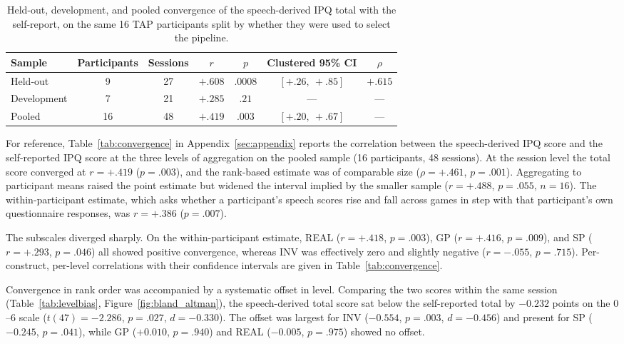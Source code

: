 \begin{table}[t]
\centering
\caption{Held-out, development, and pooled convergence of the speech-derived IPQ total with the self-report, on the same 16 TAP participants split by whether they were used to select the pipeline.}
\label{tab:heldout_convergence}
\small
\begin{tabular}{lcccccc}
\hline
Sample & Participants & Sessions & $r$ & $p$ & Clustered 95\% CI & $\rho$ \\
\hline
Held-out & 9 & 27 & $+.608$ & $.0008$ & $[+.26,\ +.85]$ & $+.615$ \\
Development & 7 & 21 & $+.285$ & $.21$ & --- & --- \\
Pooled & 16 & 48 & $+.419$ & $.003$ & $[+.20,\ +.67]$ & --- \\
\hline
\end{tabular}
\end{table}

For reference, Table~\ref{tab:convergence} in Appendix~\ref{sec:appendix} reports the correlation between the speech-derived IPQ score and the self-reported IPQ score at the three levels of aggregation on the pooled sample (16 participants, 48 sessions). At the session level the total score converged at $r=+.419$ ($p=.003$), and the rank-based estimate was of comparable size ($\rho=+.461$, $p=.001$). Aggregating to participant means raised the point estimate but widened the interval implied by the smaller sample ($r=+.488$, $p=.055$, $n=16$). The within-participant estimate, which asks whether a participant's speech scores rise and fall across games in step with that participant's own questionnaire responses, was $r=+.386$ ($p=.007$).

The subscales diverged sharply. On the within-participant estimate, REAL ($r=+.418$, $p=.003$), GP ($r=+.416$, $p=.009$), and SP ($r=+.293$, $p=.046$) all showed positive convergence, whereas INV was effectively zero and slightly negative ($r=-.055$, $p=.715$). Per-construct, per-level correlations with their confidence intervals are given in Table~\ref{tab:convergence}.


Convergence in rank order was accompanied by a systematic offset in level. Comparing the two scores within the same session (Table~\ref{tab:levelbias}, Figure~\ref{fig:bland_altman}), the speech-derived total score sat below the self-reported total by $-0.232$ points on the $0$--$6$ scale ($t(47)=-2.286$, $p=.027$, $d=-0.330$). The offset was largest for INV ($-0.554$, $p=.003$, $d=-0.456$) and present for SP ($-0.245$, $p=.041$), while GP ($+0.010$, $p=.940$) and REAL ($-0.005$, $p=.975$) showed no offset.

